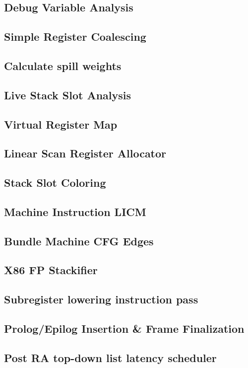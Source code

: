 \documentclass{myproc}
\begin{document}
\subsection{Debug Variable Analysis}
\subsection{Simple Register Coalescing}
\subsection{Calculate spill weights}
\subsection{Live Stack Slot Analysis}
\subsection{Virtual Register Map}
\subsection{Linear Scan Register Allocator}
\subsection{Stack Slot Coloring}
\subsection{Machine Instruction LICM}
\subsection{Bundle Machine CFG Edges}
\subsection{X86 FP Stackifier}
\subsection{Subregister lowering instruction pass}
\subsection{Prolog/Epilog Insertion \& Frame Finalization}
\subsection{Post RA top-down list latency scheduler}
\end{document}
